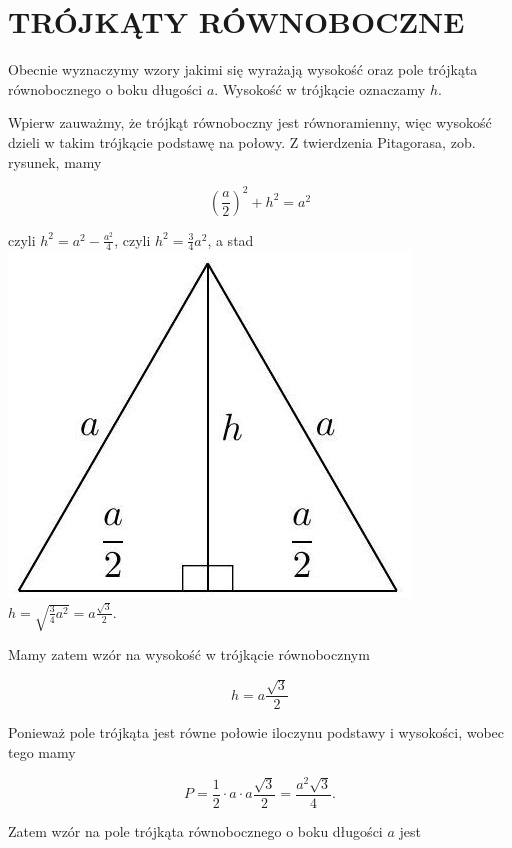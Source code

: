 \documentclass[10pt]{article}
\begin{document}
\section*{TRÓJKĄTY RÓWNOBOCZNE}
Obecnie wyznaczymy wzory jakimi się wyrażają wysokość oraz pole trójkąta równobocznego o boku długości \(a\). Wysokość w trójkącie oznaczamy \(h\).

Wpierw zauważmy, że trójkąt równoboczny jest równoramienny, więc wysokość dzieli w takim trójkącie podstawę na połowy. Z twierdzenia Pitagorasa, zob. rysunek, mamy

\[
\left(\frac{a}{2}\right)^{2}+h^{2}=a^{2}
\]

czyli \(h^{2}=a^{2}-\frac{a^{2}}{4}\), czyli \(h^{2}=\frac{3}{4} a^{2}\), a stad\\
\includegraphics[max width=\textwidth, center]{2024_11_21_71f62bd117d375398909g-131}\\
\(h=\sqrt{\frac{3}{4} a^{2}}=a \frac{\sqrt{3}}{2}\).

Mamy zatem wzór na wysokość w trójkącie równobocznym

\[
h=a \frac{\sqrt{3}}{2}
\]

Ponieważ pole trójkąta jest równe połowie iloczynu podstawy i wysokości, wobec tego mamy

\[
P=\frac{1}{2} \cdot a \cdot a \frac{\sqrt{3}}{2}=\frac{a^{2} \sqrt{3}}{4} .
\]

Zatem wzór na pole trójkąta równobocznego o boku długości \(a\) jest
\end{document}
